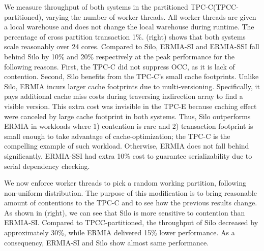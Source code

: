 We measure throughput of both systems in the partitioned TPC-C(TPCC-partitioned), varying the number of worker threads. All worker threads are given a local warehouse and does not change the local warehouse during runtime. The percentage of cross partition transaction 1\%. (right) shows that both systems scale reasonably over 24 cores. Compared to Silo, ERMIA-SI and ERMIA-SSI fall behind Silo by 10\% and 20\% respectively at the peak performance for the following reasons. First, the TPC-C did not suppress OCC, as it is lack of contention. Second, Silo benefits from the TPC-C's small cache footprints. Unlike Silo, ERMIA incurs larger cache footprints due to multi-versioning. Specifically, it pays additional cache miss costs during traversing indirection array to find a visible version. This extra cost was invisible in the TPC-E because caching effect were canceled by large cache footprint in both systems. Thus, Silo outperforms ERMIA in workloads where 1) contention is rare and 2) transaction footprint is small enough to take advantage of cache-optimization; the TPC-C is the compelling example of such workload. Otherwise, ERMIA does not fall behind significantly. ERMIA-SSI had extra 10\% cost to guarantee serializability due to serial dependency checking. %

We now enforce worker threads to pick a random working partition, following non-uniform distribution. The purpose of this modification is to bring reasonable amount of contentions to the TPC-C and to see how the previous results change. As shown in (right), we can see that Silo is more sensitive to contention than ERMIA-SI. Compared to TPCC-partitioned, the throughput of Silo decreased by approximately 30\%, while ERMIA delivered 15\% lower performance. As a consequency, ERMIA-SI and Silo show almost same performance.

